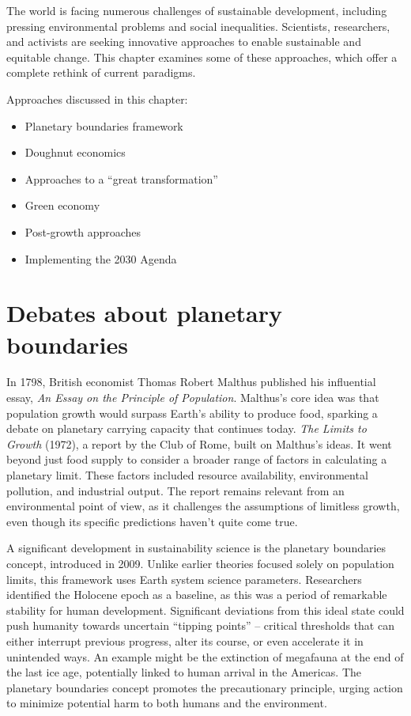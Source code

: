 \documentclass[
  a4paper,
  openany]{book}
\begin{document}
The world is facing numerous challenges of sustainable development,
including pressing environmental problems and social inequalities.
Scientists, researchers, and activists are seeking innovative approaches
to enable sustainable and equitable change. This chapter examines some
of these approaches, which offer a complete rethink of current
paradigms.

Approaches discussed in this chapter:

\begin{itemize}
\item
  Planetary boundaries framework
\item
  Doughnut economics
\item
  Approaches to a ``great transformation''
\item
  Green economy
\item
  Post-growth approaches
\item
  Implementing the 2030 Agenda
\end{itemize}

\section{Debates about planetary
boundaries}\label{debates-about-planetary-boundaries}

In 1798, British economist Thomas Robert Malthus published his
influential essay, \emph{An Essay on the Principle of Population}.
Malthus's core idea was that population growth would surpass Earth's
ability to produce food, sparking a debate on planetary carrying
capacity that continues today. \emph{The Limits to Growth} (1972), a
report by the Club of Rome, built on Malthus's ideas. It went beyond
just food supply to consider a broader range of factors in calculating a
planetary limit. These factors included resource availability,
environmental pollution, and industrial output. The report remains
relevant from an environmental point of view, as it challenges the
assumptions of limitless growth, even though its specific predictions
haven't quite come true.

A significant development in sustainability science is the planetary
boundaries concept, introduced in 2009. Unlike earlier theories focused
solely on population limits, this framework uses Earth system science
parameters. Researchers identified the Holocene epoch as a baseline, as
this was a period of remarkable stability for human development.
Significant deviations from this ideal state could push humanity towards
uncertain ``tipping points'' -- critical thresholds that can either
interrupt previous progress, alter its course, or even accelerate it in
unintended ways. An example might be the extinction of megafauna at the
end of the last ice age, potentially linked to human arrival in the
Americas. The planetary boundaries concept promotes the precautionary
principle, urging action to minimize potential harm to both humans and
the environment.
\end{document}
